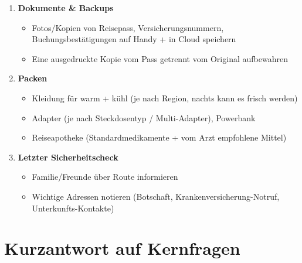 \documentclass[12pt,a4paper]{article}
\begin{document}
\begin{successbox}[title={\faPlane \hspace{0.2cm} Finale Vorbereitungen}]

\begin{enumerate}[leftmargin=*,label={\color{darkgreen}\bfseries\arabic*.}]
    \item \textbf{Dokumente \& Backups}
    \begin{itemize}[label={\color{darkgreen}\faChevronRight}]
        \item Fotos/Kopien von Reisepass, Versicherungsnummern, Buchungsbestätigungen auf Handy + in Cloud speichern
        \item Eine ausgedruckte Kopie vom Pass getrennt vom Original aufbewahren\cite{accept-reisen-1}
    \end{itemize}

    \item \textbf{Packen}
    \begin{itemize}[label={\color{darkgreen}\faChevronRight}]
        \item Kleidung für warm + kühl (je nach Region, nachts kann es frisch werden)
        \item Adapter (je nach Steckdosentyp / Multi-Adapter), Powerbank
        \item Reiseapotheke (Standardmedikamente + vom Arzt empfohlene Mittel)
    \end{itemize}

    \item \textbf{Letzter Sicherheitscheck}
    \begin{itemize}[label={\color{darkgreen}\faChevronRight}]
        \item Familie/Freunde über Route informieren
        \item Wichtige Adressen notieren (Botschaft, Krankenversicherung-Notruf, Unterkunfts-Kontakte)
    \end{itemize}
\end{enumerate}

\end{successbox}

\section{Kurzantwort auf Kernfragen}
\end{document}
